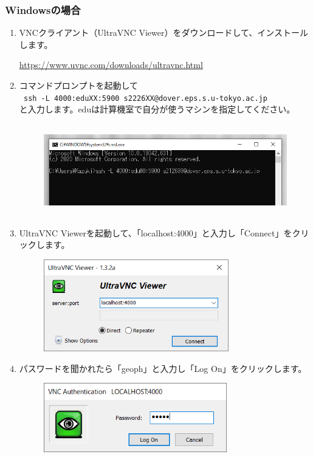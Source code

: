 \documentclass{jarticle}
\begin{document}
\subsubsection{Windowsの場合}
\begin{enumerate}
  \item VNCクライアント（UltraVNC Viewer）をダウンロードして、インストールします。
  \begin{center}
    \url{https://www.uvnc.com/downloads/ultravnc.html}
  \end{center}
  \item コマンドプロンプトを起動して\\
    \verb| ssh -L 4000:eduXX:5900 s2226XX@dover.eps.s.u-tokyo.ac.jp |  \\
  と入力します。eduは計算機室で自分が使うマシンを指定してください。
  \begin{figure}[H]
    \centering
    \includegraphics[height=4cm,pagebox=cropbox,clip]{fig/VNCWin1.png}
  \end{figure}
  \item UltraVNC Viewerを起動して、「localhost:4000」と入力し「Connect」をクリックします。
  \begin{figure}[H]
    \centering
    \includegraphics[height=4cm,pagebox=cropbox,clip]{fig/VNCWin2.png}
  \end{figure}
  \item パスワードを聞かれたら「geoph」と入力し「Log On」をクリックします。
  \begin{figure}[H]
    \centering
    \includegraphics[height=3cm,pagebox=cropbox,clip]{fig/VNCWin3.png}

\end{figure}
\end{enumerate}
\end{document}
